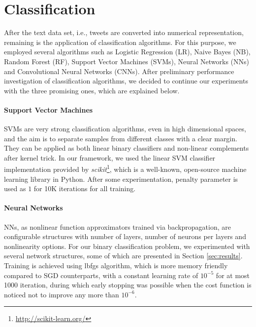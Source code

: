 \section{Classification}
\label{sec:modelSelection}
After the text data set, i.e., tweets are converted into numerical representation, remaining is the application of classification algorithms.
For this purpose, we employed several algorithms such as Logistic Regression (LR), Naive Bayes (NB), Random Forest (RF), Support Vector Machines (SVMs), Neural Networks (NNs) and Convolutional Neural Networks (CNNs).
After preliminary performance investigation of classification algorithms, we decided to continue our experiments with the three promising ones, which are explained below.

\paragraph{\textbf{Support Vector Machines}}
SVMs are very strong classification algorithms, even in high dimensional spaces, and the aim is to separate samples from different classes with a clear margin.
They can be applied as both linear binary classifiers and non-linear complements after kernel trick.
In our framework, we used the linear SVM classifier implementation provided by \textit{scikit}\footnote{\url{http://scikit-learn.org/}}, which is a well-known, open-source machine learning library in Python.
After some experimentation, penalty parameter is used as $1$ for 10K iterations for all training.


\paragraph{\textbf{Neural Networks}}
NNs, as nonlinear function approximators trained via backpropagation, are configurable structures with number of layers, number of neurons per layers and nonlinearity options.
For our binary classification problem, we experimented with several network structures, some of which are presented in Section \ref{sec:results}.
Training is achieved using lbfgs algorithm, which is more memory friendly compared to SGD counterparts, with a constant learning rate of $10^{-5}$ for at most 1000 iteration, during which early stopping was possible when the cost function is noticed not to improve any more than $10^{-6}$.

